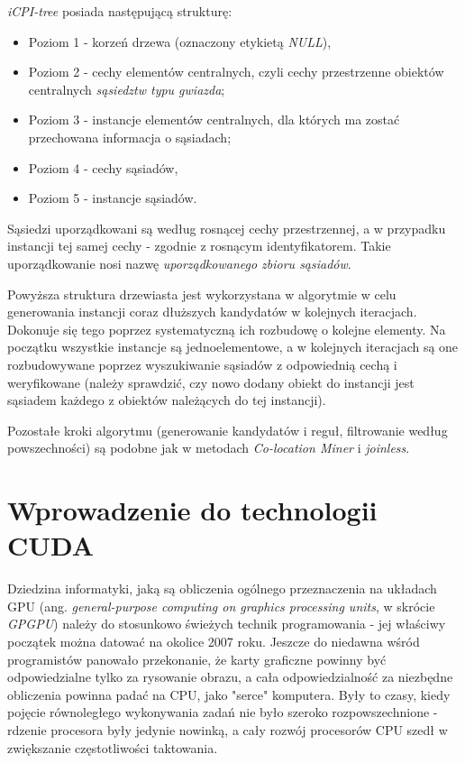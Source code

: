\documentclass[12pt]{article}
\newcounter{algorytm}
\begin{document}
\textit{iCPI-tree} posiada następującą strukturę:

\begin{itemize}
\item Poziom 1 - korzeń drzewa (oznaczony etykietą \textit{NULL}),
\item Poziom 2 - cechy elementów centralnych, czyli cechy przestrzenne obiektów centralnych \textit{sąsiedztw typu gwiazda};
\item Poziom 3 - instancje elementów centralnych, dla których ma zostać przechowana informacja o sąsiadach;
\item Poziom 4 - cechy sąsiadów,
\item Poziom 5 - instancje sąsiadów.
\end{itemize}

Sąsiedzi uporządkowani są według rosnącej cechy przestrzennej, a w przypadku instancji tej samej cechy - zgodnie z rosnącym identyfikatorem. Takie uporządkowanie nosi nazwę \textit{uporządkowanego zbioru sąsiadów}.

Powyższa struktura drzewiasta jest wykorzystana w algorytmie w celu generowania instancji coraz dłuższych kandydatów w kolejnych iteracjach. Dokonuje się tego poprzez systematyczną ich rozbudowę o kolejne elementy. Na początku wszystkie instancje są jednoelementowe, a w kolejnych iteracjach są one rozbudowywane poprzez wyszukiwanie sąsiadów z odpowiednią cechą i weryfikowane (należy sprawdzić, czy nowo dodany obiekt do instancji jest sąsiadem każdego z obiektów należących do tej instancji). 

Pozostałe kroki algorytmu (generowanie kandydatów i reguł, filtrowanie według powszechności) są podobne jak w metodach \textit{Co-location Miner} i \textit{joinless}.

\newpage

\section{Wprowadzenie do technologii CUDA}
\label{sec:cuda}

Dziedzina informatyki, jaką są obliczenia ogólnego przeznaczenia na układach GPU (ang. \textit{general-purpose computing on graphics processing units}, w skrócie \textit{GPGPU}) należy do stosunkowo świeżych technik programowania - jej właściwy początek można datować na okolice 2007 roku. Jeszcze do niedawna wśród programistów panowało przekonanie, że karty graficzne powinny być odpowiedzialne tylko za rysowanie obrazu, a cała odpowiedzialność za niezbędne obliczenia powinna padać na CPU, jako "serce" komputera. Były to czasy, kiedy pojęcie równoległego wykonywania zadań nie było szeroko rozpowszechnione - rdzenie procesora były jedynie nowinką, a cały rozwój procesorów CPU szedł w zwiększanie częstotliwości taktowania.
\end{document}
